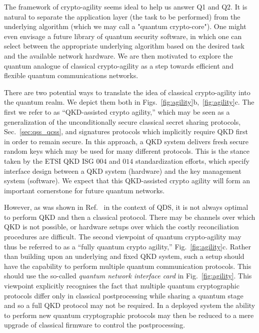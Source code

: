 The framework of crypto-agility seems ideal to help us answer Q1 and Q2. It is natural to separate the application layer (the task to be performed) from the underlying algorithm (which we may call a "quantum crypto-core"). One might even envisage a future library of quantum security software, in which one can select between the appropriate underlying algorithm based on the desired task and the available network hardware. We are then motivated to explore the quantum analogue of classical crypto-agility as a step towards efficient and flexible quantum communications networks.



There are two potential ways to translate the idea of classical crypto-agility into the quantum realm. We depict them both in Figs.~\ref{fig:agility}b,~\ref{fig:agility}c. The first we refer to as ``QKD-assisted crypto agility,'' which may be seen as a generalization of the unconditionally secure classical secret sharing protocols, Sec.~\ref{sec:qss_qcss}, and signatures protocols \cite{Wallden2015, Amiri2016a} which implicitly require QKD first in order to remain secure. In this approach, a QKD system delivers fresh secure random keys which may be used for many different protocols. This is the stance taken by the ETSI QKD ISG $004$ \cite{ETSI004} and $014$ \cite{ETSI014} standardization efforts, which specify interface design between a QKD system (hardware) and the key management system (software). We expect that this QKD-assisted crypto agility will form an important cornerstone for future quantum networks. %

However, as was shown in Ref.~\cite{Amiri2016} in the context of QDS, it is not always optimal to perform QKD and then a classical protocol. There may be channels over which QKD is not possible, or hardware setups over which the costly reconciliation procedures are difficult. The second viewpoint of quantum crypto-agility may thus be referred to as a ``fully quantum crypto agility,'' Fig.~\ref{fig:agility}c. Rather than building upon an underlying and fixed QKD system, such a setup should have the capability to perform multiple quantum communication protocols. This should use the so-called \emph{quantum network interface card} in Fig.~\ref{fig:agility}. This viewpoint explicitly recognises the fact that multiple quantum cryptographic protocols differ only in classical postprocessing while sharing a quantum stage and so a full QKD protocol may not be required. %
In a deployed system the ability to perform new quantum cryptographic protocols may then be reduced to a mere upgrade of classical firmware to control the postprocessing.


